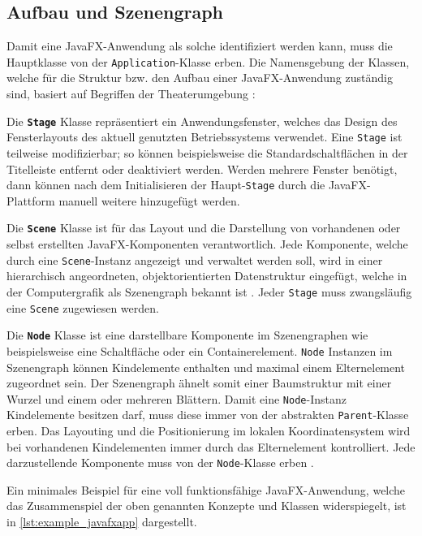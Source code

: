 \subsection{Aufbau und Szenengraph}
\label{javafx_szenengraph}
Damit eine JavaFX-Anwendung als solche identifiziert werden kann, muss die Hauptklasse von der \texttt{Application}-Klasse erben. Die Namensgebung der Klassen, welche für die Struktur bzw. den Aufbau einer JavaFX-Anwendung zuständig sind, basiert auf Begriffen der Theaterumgebung \cite{Anderson2019}:
\begin{description}
	\item Die \textbf{\texttt{Stage}} Klasse repräsentiert ein Anwendungsfenster, welches das Design des Fensterlayouts des aktuell genutzten Betriebssystems verwendet. Eine \texttt{Stage} ist teilweise modifizierbar; so können beispielsweise die Standardschaltflächen in der Titelleiste entfernt oder deaktiviert werden. Werden mehrere Fenster benötigt, dann können nach dem Initialisieren der Haupt-\texttt{Stage} durch die JavaFX-Plattform manuell weitere hinzugefügt werden.
	\item Die \textbf{\texttt{Scene}} Klasse ist für das Layout und die Darstellung von vorhandenen oder selbst erstellten JavaFX-Komponenten verantwortlich. Jede Komponente, welche durch eine \texttt{Scene}-Instanz angezeigt und verwaltet werden soll, wird in einer hierarchisch angeordneten, objektorientierten Datenstruktur eingefügt, welche in der Computergrafik als Szenengraph bekannt ist \cite{Hughes2013}. Jeder \texttt{Stage} muss zwangsläufig eine \texttt{Scene} zugewiesen werden.
	\item Die \textbf{\texttt{Node}} Klasse ist eine darstellbare Komponente im Szenengraphen wie beispielsweise eine Schaltfläche oder ein Containerelement. \texttt{Node} Instanzen im Szenengraph können Kindelemente enthalten und maximal einem Elternelement zugeordnet sein. Der Szenengraph ähnelt somit einer Baumstruktur mit einer Wurzel und einem oder mehreren Blättern. Damit eine \texttt{Node}-Instanz Kindelemente besitzen darf, muss diese immer von der abstrakten \texttt{Parent}-Klasse erben. Das Layouting und die Positionierung im lokalen Koordinatensystem wird bei vorhandenen Kindelementen immer durch das Elternelement kontrolliert. Jede darzustellende Komponente muss von der \texttt{Node}-Klasse erben \cite{Juneau2013}.
\end{description}
Ein minimales Beispiel für eine voll funktionsfähige JavaFX-Anwendung, welche das Zusammenspiel der oben genannten Konzepte und Klassen widerspiegelt, ist in \autoref{lst:example_javafxapp} dargestellt.\\
